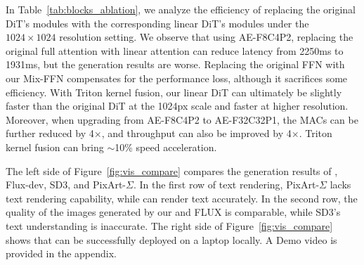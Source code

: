 In Table~\ref{tab:blocks_ablation}, we analyze the efficiency of replacing the original DiT's modules with the corresponding linear DiT's modules under the $1024\times1024$ resolution setting. 
%
We observe that using AE-F8C4P2, replacing the original full attention with linear attention can reduce latency from 2250ms to 1931ms, but the generation results are worse. Replacing the original FFN with our Mix-FFN compensates for the performance loss, although it sacrifices some efficiency. With Triton kernel fusion, our linear DiT can ultimately be slightly faster than the original DiT at the 1024px scale and faster at higher resolution. 
%
Moreover, when upgrading from AE-F8C4P2 to AE-F32C32P1, the MACs can be further reduced by 4$\times$, and throughput can also be improved by 4$\times$. Triton kernel fusion can bring $\sim$10\% speed acceleration.

The left side of Figure~\ref{fig:vis_compare} compares the generation results of \model, Flux-dev, SD3, and PixArt-$\Sigma$. 
In the first row of text rendering, PixArt-$\Sigma$ lacks text rendering capability, while \model can render text accurately. 
In the second row, the quality of the images generated by our \model and FLUX is comparable, while SD3's text understanding is inaccurate. 
The right side of Figure~\ref{fig:vis_compare} shows that \model can be successfully deployed on a laptop locally. A Demo video is provided in the appendix.











